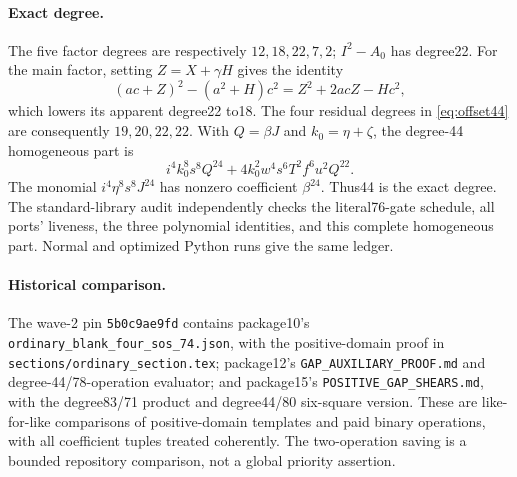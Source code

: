\paragraph{Exact degree.}
The five factor degrees are respectively $12,18,22,7,2$; $I^2-A_0$ has
degree22. For the main factor, setting $Z=X+\gamma H$ gives the identity
\[
(ac+Z)^2-(a^2+H)c^2=Z^2+2acZ-Hc^2,
\]
which lowers its apparent degree22 to18. The four residual degrees in
\eqref{eq:offset44} are consequently $19,20,22,22$. With
$Q=\beta J$ and $k_0=\eta+\zeta$, the degree-44 homogeneous part is
\[
i^4k_0^8s^8Q^{24}
 +4k_0^2w^4s^6T^2f^6u^2Q^{22}.
\]
The monomial $i^4\eta^8s^8J^{24}$ has nonzero coefficient $\beta^{24}$.
Thus44 is the exact degree. The standard-library audit independently
checks the literal76-gate schedule, all ports' liveness, the three
polynomial identities, and this complete homogeneous part. Normal and
optimized Python runs give the same ledger.

\paragraph{Historical comparison.}
The wave-2 pin \texttt{5b0c9ae9fd} contains package10's
\texttt{ordinary\_blank\_four\_sos\_74.json}, with the positive-domain
proof in \texttt{sections/ordinary\_section.tex}; package12's
\texttt{GAP\_AUXILIARY\_PROOF.md} and degree-44/78-operation evaluator;
and package15's \texttt{POSITIVE\_GAP\_SHEARS.md}, with the degree83/71
product and degree44/80 six-square version. These are like-for-like
comparisons of positive-domain templates and paid binary operations,
with all coefficient tuples treated coherently. The two-operation saving
is a bounded repository comparison, not a global priority assertion.
